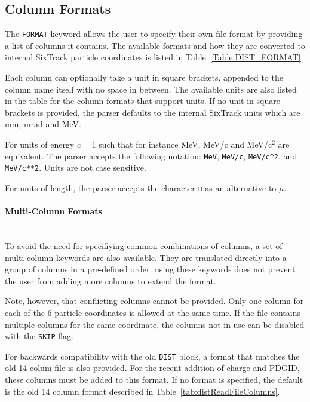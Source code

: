 \subsection{Column Formats}

The \texttt{FORMAT} keyword allows the user to specify their own file format by providing a list of columns it contains.
The available formats and how they are converted to internal SixTrack particle coordinates is listed in Table~\ref{Table:DIST_FORMAT}.

Each column can optionally take a unit in square brackets, appended to the column name itself with no space in between.
The available units are also listed in the table for the column formats that support units.
If no unit in square brackets is provided, the parser defaults to the internal SixTrack units which are mm, mrad and MeV.

For units of energy $c=1$ such that for instance MeV, MeV/c and MeV/c$^2$ are equivalent.
The parser accepts the following notation: \texttt{MeV}, \texttt{MeV/c}, \texttt{MeV/c\^{}2}, and \texttt{MeV/c**2}.
Units are not case sensitive.

For units of length, the parser accepts the character \texttt{u} as an alternative to $\mu$.

\paragraph{Multi-Column Formats}~\\

To avoid the need for specifiying common combinations of columns, a set of multi-column keywords are also available.
They are translated directly into a group of columns in a pre-defined order.
using these keywords does not prevent the user from adding more columns to extend the format.

Note, however, that conflicting columns cannot be provided.
Only one column for each of the 6 particle coordinates is allowed at the same time.
If the file contains multiple columns for the same coordinate, the columns not in use can be disabled with the \texttt{SKIP} flag.

For backwards compatibility with the old \texttt{DIST} block, a format that matches the old 14 colum file is also provided.
For the recent addition of charge and PDGID, these columns must be added to this format.
If no format is specified, the default is the old 14 column format described in Table~\ref{tab:distReadFileColumns}.

